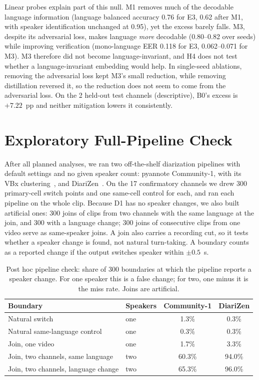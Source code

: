 \documentclass[conference]{IEEEtran}
\begin{document}
Linear probes explain part of this null. M1 removes much of the decodable language
information (language balanced accuracy 0.76 for E3, 0.62 after M1, with speaker
identification unchanged at 0.95), yet the excess barely falls. M3, despite its adversarial
loss, makes language \emph{more} decodable (0.80--0.82 over seeds) while improving
verification (mono-language EER 0.118 for E3, 0.062--0.071 for M3). M3 therefore did not
become language-invariant, and H4 does not test whether a language-invariant embedding would
help. In single-seed ablations, removing the adversarial loss kept M3's small reduction,
while removing distillation reversed it, so the reduction does not seem to come from the
adversarial loss. On the 2 held-out test channels (descriptive), B0's excess is $+7.22$~pp
and neither mitigation lowers it consistently.

\section{Exploratory Full-Pipeline Check}
\label{sec:pipe}
After all planned analyses, we ran two off-the-shelf diarization pipelines with
default settings and no given speaker count: pyannote Community-1, with its VBx
clustering~\cite{landini2022vbx}, and DiariZen~\cite{han2025diarizen}. On the 17
confirmatory channels we drew 300 primary-cell switch points and one same-cell control for
each, and ran each pipeline on the whole clip. Because D1 has no speaker changes, we also
built artificial ones: 300 joins of clips from two channels with the same language at the
join, and 300 with a language change; 300 joins of consecutive clips from one video serve as
same-speaker joins. A join also carries a recording cut, so it tests whether a speaker change
is found, not natural turn-taking. A boundary counts as a reported change if the output
switches speaker within $\pm0.5$~s.

\begin{table}[t]
\caption{Post hoc pipeline check: share of 300 boundaries at which the pipeline reports a
speaker change. For one speaker this is a false change; for two, one minus it is the miss
rate. Joins are artificial.}
\label{tab:pipe}
\centering
\setlength{\tabcolsep}{3pt}
\begin{tabular}{llcc}
\toprule
Boundary & Speakers & Community-1 & DiariZen \\
\midrule
Natural switch & one & 1.3\% & 0.3\% \\
Natural same-language control & one & 0.3\% & 0.3\% \\
Join, one video & one & 1.7\% & 3.3\% \\
Join, two channels, same language & two & 60.3\% & 94.0\% \\
Join, two channels, language change & two & 65.3\% & 96.0\% \\
\bottomrule
\end{tabular}
\end{table}
\end{document}
